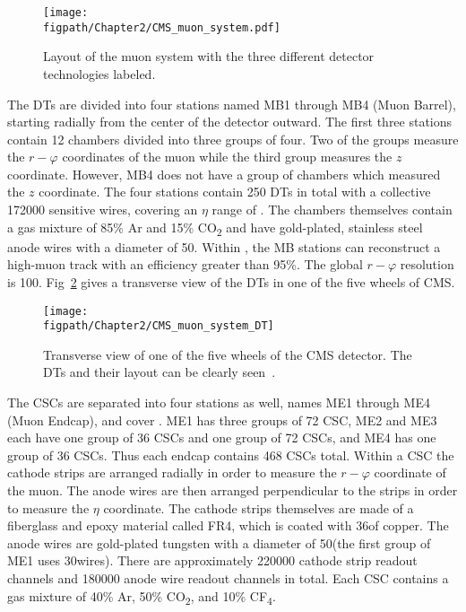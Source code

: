 \begin{figure}[!hbt]
    \centering
    \texttt{[image: \\figpath/Chapter2/CMS\_muon\_system.pdf]}
    \caption{Layout of the muon system with the three different detector technologies labeled.}
    \label{fig:CMS_muon_system}
\end{figure}

The DTs are divided into four stations named MB1 through MB4 (Muon Barrel), starting radially from the center of the detector outward.
The first three stations contain 12 chambers divided into three groups of four.
Two of the groups measure the $r-\varphi$ coordinates of the muon while the third group measures the $z$ coordinate.
However, MB4 does not have a group of chambers which measured the $z$ coordinate.
The four stations contain 250 DTs in total with a collective 172000 sensitive wires, covering an $\eta$ range of .
The chambers themselves contain a gas mixture of 85\% Ar and 15\% CO\textsubscript{2} and have gold-plated, stainless steel anode wires with a diameter of 50\mum.
Within , the MB stations can reconstruct a high-\pt muon track with an efficiency greater than 95\%.
The global $r-\varphi$ resolution is 100\mum.
Fig~\ref{fig:CMS_muon_system_DT} gives a transverse view of the DTs in one of the five wheels of CMS.

\begin{figure}[!hbt]
    \centering
    \texttt{[image: \\figpath/Chapter2/CMS\_muon\_system\_DT]}
    \caption{Transverse view of one of the five wheels of the CMS detector. The DTs and their layout can be clearly seen~\cite{Chatrchyan:2008aa}.}
    \label{fig:CMS_muon_system_DT}
\end{figure}

The CSCs are separated into four stations as well, names ME1 through ME4 (Muon Endcap), and cover .
ME1 has three groups of 72 CSC, ME2 and ME3 each have one group of 36 CSCs and one group of 72 CSCs, and ME4 has one group of 36 CSCs.
Thus each endcap contains 468 CSCs total.
Within a CSC the cathode strips are arranged radially in order to measure the $r-\varphi$ coordinate of the muon.
The anode wires are then arranged perpendicular to the strips in order to measure the $\eta$ coordinate.
The cathode strips themselves are made of a fiberglass and epoxy material called FR4, which is coated with 36\mum of copper.
The anode wires are gold-plated tungsten with a diameter of 50\mum (the first group of ME1 uses 30\mum wires).
There are approximately 220000 cathode strip readout channels and 180000 anode wire readout channels in total.
Each CSC contains a gas mixture of 40\% Ar, 50\% CO\textsubscript{2}, and 10\% CF\textsubscript{4}.

